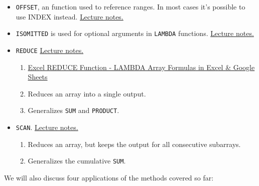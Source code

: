 \documentclass[
  letterpaper,
  DIV=11,
  numbers=noendperiod]{scrreprt}
\providecommand{\tightlist}{%
  \setlength{\itemsep}{0pt}\setlength{\parskip}{0pt}}\usepackage{longtable,booktabs,array}
\begin{document}
\begin{itemize}
\tightlist
\item
  \texttt{OFFSET}, an function used to reference ranges. In most cases
  it's possible to use INDEX instead.
  \href{https://github.com/BI-DS/ELE-3915/blob/main/slides/lecture06/01_offset.xlsx}{Lecture
  notes.}
\item
  \texttt{ISOMITTED} is used for optional arguments in \texttt{LAMBDA}
  functions.
  \href{https://github.com/BI-DS/ELE-3915/blob/main/slides/lecture06/02_optional_arguments.xlsx}{Lecture
  notes.}
\item
  \texttt{REDUCE}
  \href{https://github.com/BI-DS/ELE-3915/blob/main/slides/lecture06/03_reduce.xlsx}{Lecture
  notes.}

  \begin{enumerate}
  \def\labelenumi{\arabic{enumi}.}
  \item
    \href{https://www.youtube.com/watch?v=Gt7_BtFYfBw\&ab_channel=LearnGoogleSheets\%26ExcelSpreadsheets}{Excel
    REDUCE Function - LAMBDA Array Formulas in Excel \& Google Sheets}
  \item
    Reduces an array into a single output.
  \item
    Generalizes \texttt{SUM} and \texttt{PRODUCT}.
  \end{enumerate}
\item
  \texttt{SCAN}.
  \href{https://github.com/BI-DS/ELE-3915/blob/main/slides/lecture06/05_scan.xlsx}{Lecture
  notes.}

  \begin{enumerate}
  \def\labelenumi{\arabic{enumi}.}
  \item
    Reduces an array, but keeps the output for all consecutive
    subarrays.
  \item
    Generalizes the cumulative \texttt{SUM}.
  \end{enumerate}
\end{itemize}

We will also discuss four applications of the methods covered so far:
\end{document}
